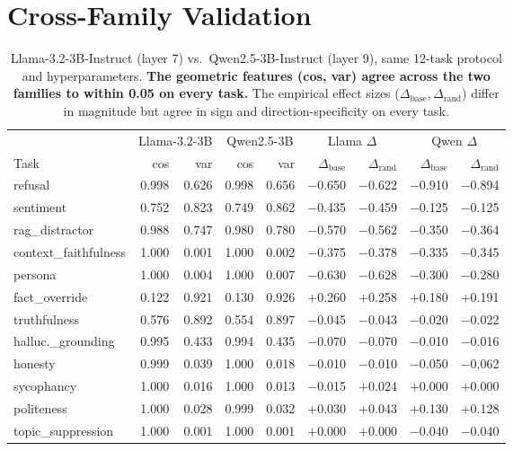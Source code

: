 \documentclass[11pt]{article}
\begin{document}
\section{Cross-Family Validation}
\label{sec:crossfamily}

\begin{table}[t]
\centering\footnotesize
\setlength{\tabcolsep}{5pt}
\begin{tabular}{l r r r r r r r r}
\toprule
& \multicolumn{2}{c}{Llama-3.2-3B} & \multicolumn{2}{c}{Qwen2.5-3B}
& \multicolumn{2}{c}{Llama $\Delta$} & \multicolumn{2}{c}{Qwen $\Delta$} \\
\cmidrule(lr){2-3} \cmidrule(lr){4-5} \cmidrule(lr){6-7} \cmidrule(lr){8-9}
Task & cos & var & cos & var & $\Delta_{\text{base}}$ & $\Delta_{\text{rand}}$
                                  & $\Delta_{\text{base}}$ & $\Delta_{\text{rand}}$ \\
\midrule
refusal              & 0.998 & 0.626 & 0.998 & 0.656 & $-$0.650 & $-$0.622 & $-$0.910 & $-$0.894 \\
sentiment            & 0.752 & 0.823 & 0.749 & 0.862 & $-$0.435 & $-$0.459 & $-$0.125 & $-$0.125 \\
rag\_distractor      & 0.988 & 0.747 & 0.980 & 0.780 & $-$0.570 & $-$0.562 & $-$0.350 & $-$0.364 \\
context\_faithfulness & 1.000 & 0.001 & 1.000 & 0.002 & $-$0.375 & $-$0.378 & $-$0.335 & $-$0.345 \\
persona              & 1.000 & 0.004 & 1.000 & 0.007 & $-$0.630 & $-$0.628 & $-$0.300 & $-$0.280 \\
fact\_override       & 0.122 & 0.921 & 0.130 & 0.926 & $+$0.260 & $+$0.258 & $+$0.180 & $+$0.191 \\
truthfulness         & 0.576 & 0.892 & 0.554 & 0.897 & $-$0.045 & $-$0.043 & $-$0.020 & $-$0.022 \\
halluc.\_grounding   & 0.995 & 0.433 & 0.994 & 0.435 & $-$0.070 & $-$0.070 & $-$0.010 & $-$0.016 \\
honesty              & 0.999 & 0.039 & 1.000 & 0.018 & $-$0.010 & $-$0.010 & $-$0.050 & $-$0.062 \\
sycophancy           & 1.000 & 0.016 & 1.000 & 0.013 & $-$0.015 & $+$0.024 & $+$0.000 & $+$0.000 \\
politeness           & 1.000 & 0.028 & 0.999 & 0.032 & $+$0.030 & $+$0.043 & $+$0.130 & $+$0.128 \\
topic\_suppression   & 1.000 & 0.001 & 1.000 & 0.001 & $+$0.000 & $+$0.000 & $-$0.040 & $-$0.040 \\
\bottomrule
\end{tabular}
\caption{Llama-3.2-3B-Instruct (layer 7) vs.~Qwen2.5-3B-Instruct
(layer 9), same 12-task protocol and hyperparameters. \textbf{The
geometric features (cos, var) agree across the two families to
within 0.05 on every task.} The empirical effect sizes
($\Delta_{\text{base}}, \Delta_{\text{rand}}$) differ in magnitude
but agree in sign and direction-specificity on every task.}
\label{tab:crossfamily}
\end{table}
\end{document}
